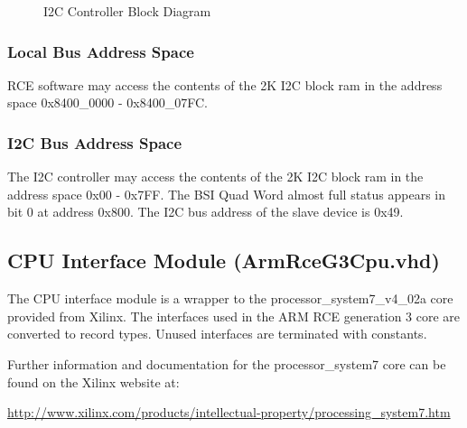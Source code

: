 \documentclass[11pt]{article}
\begin{document}
\begin{figure}[H]
   \centering
   \caption{I2C Controller Block Diagram}
   \label{fig:i2c_cntrl_block}
\end{figure}

\subsubsection{Local Bus Address Space}

RCE software may access the contents of the 2K I2C block ram in the address space 0x8400\_0000 - 0x8400\_07FC.

\subsubsection{I2C Bus Address Space}

The I2C controller may access the contents of the 2K I2C block ram in the address space 0x00 - 0x7FF. 
The BSI Quad Word almost full status appears in bit 0 at address 0x800.
The I2C bus address of the slave device is 0x49.

\subsection{CPU Interface Module (ArmRceG3Cpu.vhd)}
\label{subsec:ArmRceG3Cpu}

The CPU interface module is a wrapper to the processor\_system7\_v4\_02a core provided from Xilinx. 
The interfaces used in the ARM RCE generation 3 core are converted to record types. Unused interfaces are terminated with constants.

Further information and documentation for the processor\_system7 core can be found on the Xilinx website at:
\begin{center}
   \url{http://www.xilinx.com/products/intellectual-property/processing_system7.htm}
\end{center}
\end{document}

